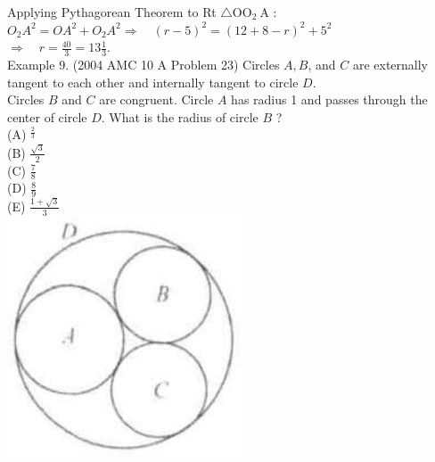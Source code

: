 \documentclass[10pt]{article}
\begin{document}
Applying Pythagorean Theorem to Rt \(\triangle \mathrm{OO}_{2} \mathrm{~A}\) :\\
\(O_{2} A^{2}=O A^{2}+O_{2} A^{2} \Rightarrow \quad(r-5)^{2}=(12+8-r)^{2}+5^{2}\)\\
\(\Rightarrow \quad r=\frac{40}{3}=13 \frac{1}{3}\).\\
Example 9. (2004 AMC 10 A Problem 23) Circles \(A, B\), and \(C\) are externally tangent to each other and internally tangent to circle \(D\).\\
Circles \(B\) and \(C\) are congruent. Circle \(A\) has radius 1 and passes through the center of circle \(D\). What is the radius of circle \(B\) ?\\
(A) \({ }^{\frac{2}{3}}\)\\
(B) \(\frac{\sqrt{3}}{2}\)\\
(C) \(\frac{7}{8}\)\\
(D) \(\frac{8}{9}\)\\
(E) \(\frac{1+\sqrt{3}}{3}\)\\
\includegraphics[max width=\textwidth, center]{2025_04_17_97bc1f7e44d93c271a88g-180}
\end{document}
